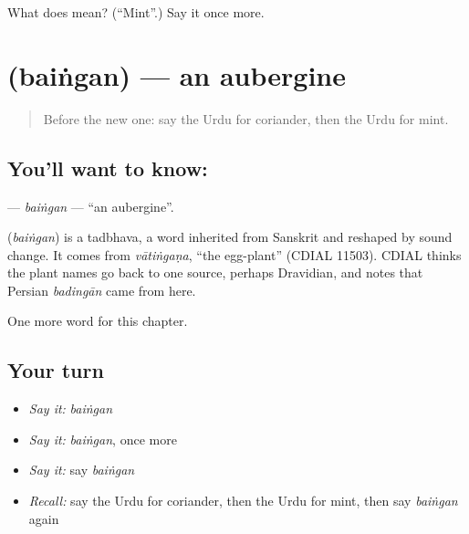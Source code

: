 \begin{tcolorbox}[breakable,colback=teal!4,colframe=teal!35!black,title={Before you move on}]
What does  mean? (\textquotedblleft{}Mint\textquotedblright{}.) Say it once more.
\end{tcolorbox}
\section[\texorpdfstring{\ur{بینگن} (baiṅgan)}{بینگن (baiṅgan)}]{ (baiṅgan) — an aubergine}

\label{lesson:UR-C226-baingan}



\begin{quote}
Before the new one: say the Urdu for coriander, then the Urdu for mint.
\end{quote}

\subsection*{You'll want to know: }
\textbf{} — \emph{baiṅgan} — \textquotedblleft{}an aubergine\textquotedblright{}.

\begin{cousinweb}
\textbf{} (\emph{baiṅgan}) is a tadbhava, a word inherited from Sanskrit and reshaped by sound change. It comes from \emph{vātiṅgaṇa}, \textquotedblleft{}the egg-plant\textquotedblright{} (CDIAL 11503). CDIAL thinks the plant names go back to one source, perhaps Dravidian, and notes that Persian \emph{badingān} came from here.
\end{cousinweb}

\begin{grammarlens}[title={What you've built}]
One more word for this chapter.
\end{grammarlens}

\subsection*{Your turn}
\begin{itemize}
\raggedright
  \item \emph{Say it:} \emph{baiṅgan}
  \item \emph{Say it:} \emph{baiṅgan}, once more
  \item \emph{Say it:} say \emph{baiṅgan}
  \item \emph{Recall:} say the Urdu for coriander, then the Urdu for mint, then say \emph{baiṅgan} again
\end{itemize}

